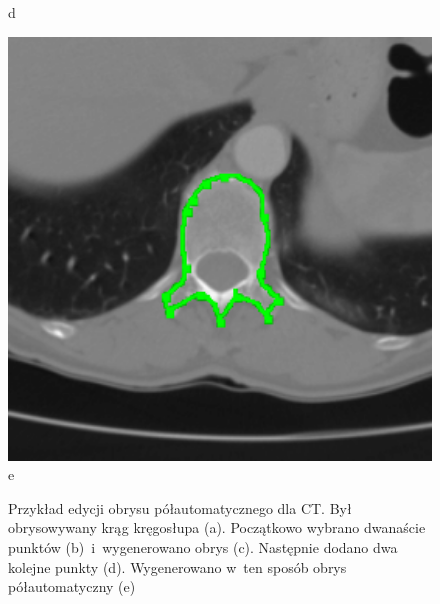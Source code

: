 \documentclass[a4paper,11pt,twoside,openright]{report}
\theoremstyle{definition}
\begin{document}
\begin{figure}[h!]
\begin{center}
\begin{center}
		d
	\end{center}
	\endminipage\hfill
	\begin{center}
		\includegraphics[width=1.0\textwidth]{178}
		e
	\end{center}
	\endminipage\hfill
	\caption{Przykład edycji obrysu półautomatycznego dla CT. Był obrysowywany krąg kręgosłupa (a).
	Początkowo wybrano dwanaście punktów
	(b)~i~wygenerowano obrys (c). Następnie dodano dwa kolejne punkty (d).
	Wygenerowano w~ten sposób obrys półautomatyczny (e)}
	\label{fig:174}
\end{center}
\end{figure}
\end{document}
